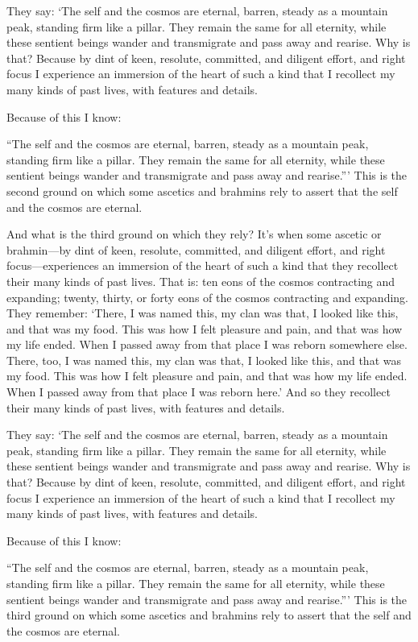\documentclass[12pt,openany]{book}%
\begin{document}
They say: ‘The self and the cosmos are eternal, barren, steady as a mountain peak, standing firm like a pillar. They remain the same for all eternity, while these sentient beings wander and transmigrate and pass away and rearise. Why is that? Because by dint of keen, resolute, committed, and diligent effort, and right focus I experience an immersion of the heart of such a kind that I recollect my many kinds of past lives, with features and details. 

Because of this I know: 

“The self and the cosmos are eternal, barren, steady as a mountain peak, standing firm like a pillar. They remain the same for all eternity, while these sentient beings wander and transmigrate and pass away and rearise.”’ This is the second ground on which some ascetics and brahmins rely to assert that the self and the cosmos are eternal. 

And what is the third ground on which they rely? It’s when some ascetic or brahmin—by dint of keen, resolute, committed, and diligent effort, and right focus—experiences an immersion of the heart of such a kind that they recollect their many kinds of past lives. That is: ten eons of the cosmos contracting and expanding; twenty, thirty, or forty eons of the cosmos contracting and expanding. They remember: ‘There, I was named this, my clan was that, I looked like this, and that was my food. This was how I felt pleasure and pain, and that was how my life ended. When I passed away from that place I was reborn somewhere else. There, too, I was named this, my clan was that, I looked like this, and that was my food. This was how I felt pleasure and pain, and that was how my life ended. When I passed away from that place I was reborn here.’ And so they recollect their many kinds of past lives, with features and details. 

They say: ‘The self and the cosmos are eternal, barren, steady as a mountain peak, standing firm like a pillar. They remain the same for all eternity, while these sentient beings wander and transmigrate and pass away and rearise. Why is that? Because by dint of keen, resolute, committed, and diligent effort, and right focus I experience an immersion of the heart of such a kind that I recollect my many kinds of past lives, with features and details. 

Because of this I know: 

“The self and the cosmos are eternal, barren, steady as a mountain peak, standing firm like a pillar. They remain the same for all eternity, while these sentient beings wander and transmigrate and pass away and rearise.”’ This is the third ground on which some ascetics and brahmins rely to assert that the self and the cosmos are eternal. 
\end{document}
